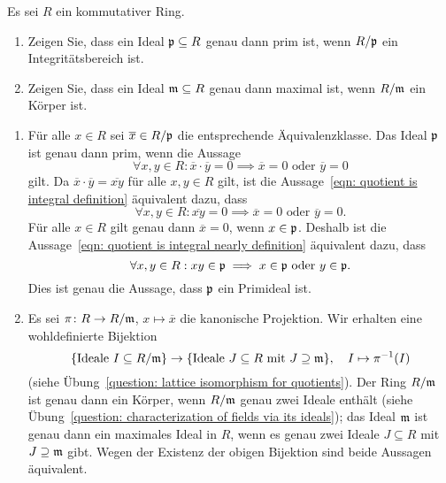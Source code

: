 \begin{question}
  Es sei $R$ ein kommutativer Ring.
  \begin{enumerate}
    \item
      Zeigen Sie, dass ein Ideal $\mathfrak{p} \subseteq R$ genau dann prim ist, wenn $R/\mathfrak{p}$ ein Integritätsbereich ist.
    \item
      Zeigen Sie, dass ein Ideal $\mathfrak{m} \subseteq R$ genau dann maximal ist, wenn $R/\mathfrak{m}$ ein Körper ist. 
  \end{enumerate}
\end{question}


\begin{solution}
  \begin{enumerate}
    \item
      Für alle $x \in R$ sei $\overline{x} \in R/\mathfrak{p}$ die entsprechende Äquivalenzklasse.
      Das Ideal $\mathfrak{p}$ ist genau dann prim, wenn die Aussage
      \begin{equation}
        \label{eqn: quotient is integral definition}
        \forall x, y \in R
        :
        \overline{x} \cdot \overline{y} = 0
        \implies
        \text{$\overline{x} = 0$ oder $\overline{y} = 0$}
      \end{equation}
      gilt. Da $\overline{x} \cdot \overline{y} = \overline{xy}$ für alle $x, y \in R$ gilt, ist die Aussage~\eqref{eqn: quotient is integral definition} äquivalent dazu, dass
      \begin{equation}
        \label{eqn: quotient is integral nearly definition}
        \forall x, y \in R
        :
        \overline{xy} = 0
        \implies
        \text{$\overline{x} = 0$ oder $\overline{y} = 0$}.
      \end{equation}
      Für alle $x \in R$ gilt genau dann $\overline{x} = 0$, wenn $x \in \mathfrak{p}$.
      Deshalb ist die Aussage~\eqref{eqn: quotient is integral nearly definition} äquivalent dazu, dass
      \begin{equation}
        \label{eqn: quotient is integral via prime }
        \forall x, y \in R
        :
        xy \in \mathfrak{p}
        \implies
        \text{$x \in \mathfrak{p}$ oder $y \in \mathfrak{p}$}.
      \end{equation}
      Dies ist genau die Aussage, dass $\mathfrak{p}$ ein Primideal ist.
    \item
      Es sei $\pi \colon R \to R/\mathfrak{m}$, $x \mapsto \overline{x}$ die kanonische Projektion.
      Wir erhalten eine wohldefinierte Bijektion
      \[
            \{ \text{Ideale $I \subseteq R/\mathfrak{m}$} \}
        \to \{ \text{Ideale $J \subseteq R$ mit $J \supseteq \mathfrak{m}$} \},
        \quad
        I \mapsto \pi^{-1}(I)
      \]
      (siehe Übung~\ref{question: lattice isomorphism for quotients}).
      Der Ring $R/\mathfrak{m}$ ist genau dann ein Körper, wenn $R/\mathfrak{m}$ genau zwei Ideale enthält (siehe Übung~\ref{question: characterization of fields via its ideals}); das Ideal $\mathfrak{m}$ ist genau dann ein maximales Ideal in $R$, wenn es genau zwei Ideale $J \subseteq R$ mit $J \supseteq \mathfrak{m}$ gibt.
      Wegen der Existenz der obigen Bijektion sind beide Aussagen äquivalent.
  \end{enumerate}
\end{solution}


